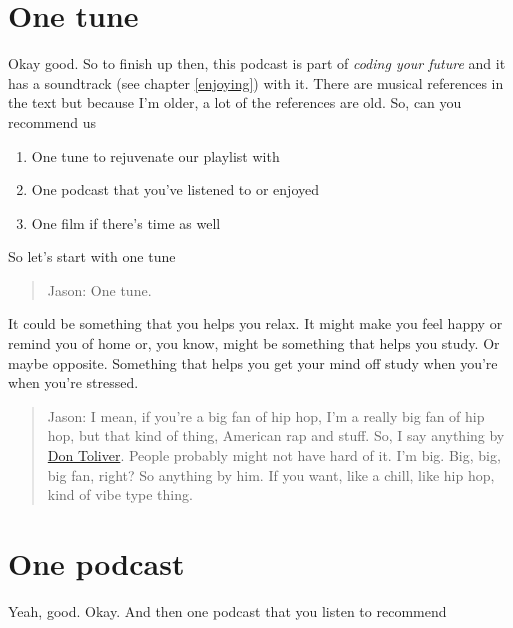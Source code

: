 \documentclass[
]{book}
\providecommand{\tightlist}{%
  \setlength{\itemsep}{0pt}\setlength{\parskip}{0pt}}
\begin{document}
\hypertarget{jtune}{%
\section{One tune}\label{jtune}}

Okay good. So to finish up then, this podcast is part of \emph{coding your future} and it has a soundtrack (see chapter \ref{enjoying}) with it. There are musical references in the text but because I'm older, a lot of the references are old. So, can you recommend us

\begin{enumerate}
\def\labelenumi{\arabic{enumi}.}
\tightlist
\item
  One tune to rejuvenate our playlist with
\item
  One podcast that you've listened to or enjoyed
\item
  One film if there's time as well
\end{enumerate}

So let's start with one tune

\begin{quote}
Jason: One tune.
\end{quote}

It could be something that you helps you relax. It might make you feel happy or remind you of home or, you know, might be something that helps you study. Or maybe opposite. Something that helps you get your mind off study when you're when you're stressed.

\begin{quote}
Jason: I mean, if you're a big fan of hip hop, I'm a really big fan of hip hop, but that kind of thing, American rap and stuff. So, I say anything by \href{https://en.wikipedia.org/wiki/Don_Toliver}{Don Toliver}. \citep{noidea} People probably might not have hard of it. I'm big. Big, big, big fan, right? So anything by him. If you want, like a chill, like hip hop, kind of vibe type thing.
\end{quote}

\hypertarget{jpodcast}{%
\section{One podcast}\label{jpodcast}}

Yeah, good. Okay. And then one podcast that you listen to recommend
\end{document}
